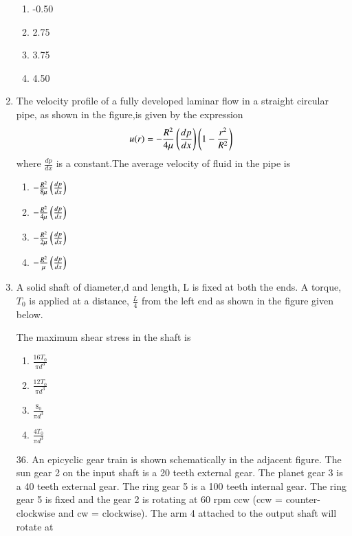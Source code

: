 \documentclass[journal]{IEEEtran}
\begin{document}
\begin{enumerate}
\begin{figure}[!ht]
    \label{fig:composite wall}
    \end{figure}
\begin{enumerate}
    \item  -0.50
    \item  2.75
    \item  3.75
    \item  4.50
  \end{enumerate} 
\item The velocity profile of a fully developed laminar flow in a straight circular pipe, as shown in the figure,is given by the expression
$$ u(r) = -\frac{R^2}{4 \mu} \left(\frac{dp}{dx}\right)\left(1 - \frac{r^2}{R^2}\right)$$ where $\frac{dp}{dx}$ is a constant.The average velocity of fluid in the pipe is
\begin{figure}[!ht]
    \centering
    \label{fig:velocity profile}
    \end{figure}
\begin{enumerate}
    \item  $-\frac{R^2}{8 \mu} \left(\frac{dp}{dx}\right)$
    \item  $-\frac{R^2}{4 \mu} \left(\frac{dp}{dx}\right)$
    \item  $-\frac{R^2}{2 \mu} \left(\frac{dp}{dx}\right)$
    \item  $-\frac{R^2}{ \mu} \left(\frac{dp}{dx}\right)$
  \end{enumerate}
\item A solid shaft of diameter,d and length, L is fixed at both the ends. A torque, $T_0$ is applied at a distance, $\frac{L}{4}$ from the left end as shown in the figure given below.
\begin{figure}[!ht]
    \centering
    \label{fig:shaft}
    \end{figure}
The maximum shear stress in the shaft is 
\begin{enumerate}
    \item  $\frac{16T_0}{\pi d^3}$
    \item  $\frac{12T_0}{\pi d^3}$
    \item  $\frac{8_0}{\pi d^3}$
    \item  $\frac{4T_0}{\pi d^3}$
  \end{enumerate}
\item[36.] An epicyclic gear train is shown schematically in the adjacent figure. The sun gear 2 on the input shaft is a 20 teeth external gear. The planet gear 3 is a 40 teeth external gear. The ring gear 5 is a 100 teeth internal gear. The ring gear 5 is fixed and the gear 2 is rotating at 60 rpm ccw (ccw = counter-clockwise and cw = clockwise). The arm 4 attached to the output shaft will rotate at 

\end{enumerate}
\end{document}
